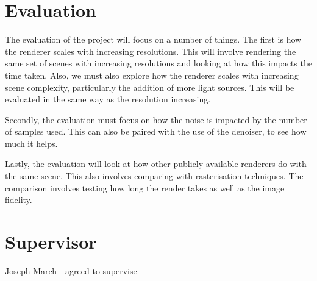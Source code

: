 \documentclass[12pt, a4paper]{article}
\begin{document}
    \section*{Evaluation}
    The evaluation of the project will focus on a number of things. The first is how the renderer scales with increasing resolutions. This will involve rendering the same set of scenes with increasing resolutions and looking at how this impacts the time taken. Also, we must also explore how the renderer scales with increasing scene complexity, particularly the addition of more light sources. This will be evaluated in the same way as the resolution increasing.

    Secondly, the evaluation must focus on how the noise is impacted by the number of samples used. This can also be paired with the use of the denoiser, to see how much it helps.

    Lastly, the evaluation will look at how other publicly-available renderers do with the same scene. This also involves comparing with rasterisation techniques. The comparison involves testing how long the render takes as well as the image fidelity.

    \section*{Supervisor}
    Joseph March - agreed to supervise
\end{document}

